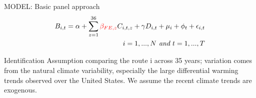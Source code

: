 \documentclass{beamer}
\begin{document}
\begin{frame}{MODEL: Basic panel approach}
    \begin{equation}
      \begin{aligned}
        B_{i,t}=\alpha + \sum_{z=1}^{36} \textcolor{red}{\beta_{FE, z}} C_{i,t,z} + \gamma D_{i,t} + \mu_i + \phi_t + \epsilon_{i,t} \\ \textit{$i=1,...,N$ and $t=1,...,T$}
        \label{equ:e1}
      \end{aligned}
    \end{equation}
    \begin{block}{Identification Assumption}
    comparing the route i across 35 years; variation comes from the natural climate variability, especially the large differential warming trends observed over the United States. We assume the recent climate trends are exogenous.
   \end{block}
\end{frame}

\end{document}
